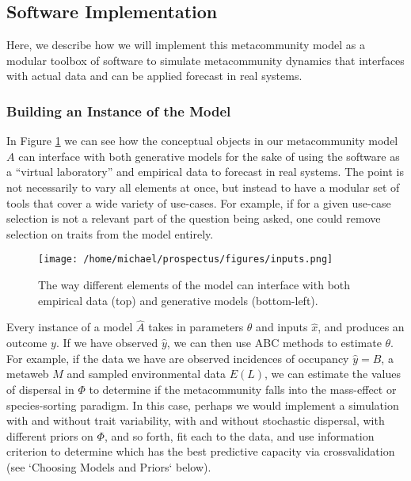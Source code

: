 \documentclass[]{article}
\begin{document}
\hypertarget{software-implementation}{%
\subsection{Software Implementation}\label{software-implementation}}

Here, we describe how we will implement this metacommunity model as a
modular toolbox of software to simulate metacommunity dynamics that
interfaces with actual data and can be applied forecast in real systems.

\hypertarget{interfacing-with-generative-models-and-data}{%
\subsubsection{Building an Instance of the Model}
\label{interfacing-with-generative-models-and-data}}
In Figure \ref{fig:inputs} we can see how the conceptual objects in our metacommunity
model $A$ can interface with both generative models for the sake of using the
software as a ``virtual laboratory'' \citep{railsback_agent-based_2011} and
empirical data to forecast in real systems. The point is not necessarily
to vary all elements at once, but instead to have a modular set of tools
that cover a wide variety of use-cases. For example, if for a given use-case selection is not a relevant part of the question being asked, one could remove selection on traits from the model entirely.

\begin{figure}[H]
\centering
\texttt{[image: /home/michael/prospectus/figures/inputs.png]}
\caption{The way different elements of the model can interface with both empirical data (top) and generative models (bottom-left).} \label{fig:inputs}
\end{figure}

Every instance of a model $\hat{A}$ takes in parameters $\theta$ and inputs $\hat{x}$, and produces an outcome $y$. If we have observed $\hat{y}$, we can then use ABC methods to estimate $\theta$. For example, if the data we have are observed incidences of occupancy $\hat{y} = \hat{B}$, a metaweb $M$ and sampled environmental data $E(L)$, we can estimate the values of dispersal in $\Phi$ to determine if the metacommunity falls into the mass-effect or species-sorting paradigm. In this case, perhaps we would implement a simulation with and without trait variability, with and without stochastic dispersal, with different priors on $\Phi$, and so forth, fit each to the data, and use information criterion to determine which has the best predictive capacity via crossvalidation (see `Choosing Models and Priors` below).
\end{document}
